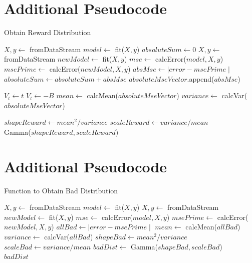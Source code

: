 \documentclass{mpaper}
\begin{document}
\begin{appendix}

\section{Additional Pseudocode}\label{rewarddist}
\begin{algorithm}[h]
\caption{Obtain Reward Distribution}
\begin{algorithmic}
    \State $X, y \gets$ fromDataStream
    \State $model \gets$ fit($X,y$)
    \State $absoluteSum \gets 0$
        \State $X, y \gets$ fromDataStream
        \State $newModel \gets$ fit($X,y$)
        \State $mse \gets$ calcError($model,X,y$)
        \State $msePrime \gets$ calcError($newModel,X,y$)
        \State $absMse \gets \mid error - msePrime \mid$
        \State $absoluteSum \gets absoluteSum + absMse$
        \State $absoluteMseVector$.append($absMse$)
        
            \State $V_t \gets t$
        \Else
            \State $V_t \gets -B$
        \EndIf
    \EndFor
    \State $mean \gets$ calcMean($absoluteMseVector$)
    \State $variance \gets$ calcVar($absoluteMseVector$)
    
    \State $shapeReward \gets mean^2/variance$
    \State $scaleReward \gets variance/mean$\\
    \Return Gamma($shapeReward, scaleReward$)
    
\EndFunction
\end{algorithmic}
\end{algorithm}

\section{Additional Pseudocode}\label{baddist}
\begin{algorithm}[h]
\caption{Function to Obtain Bad Distribution}
\begin{algorithmic}
    \State $X, y \gets$ fromDataStream
    \State $model \gets$ fit($X,y$)
        \State $X, y \gets$ fromDataStream
        \State $newModel \gets$ fit($X,y$)
        \State $mse \gets$ calcError($model,X,y$)
        \State $msePrime \gets$ calcError($newModel,X,y$)
        \State $allBad \gets \mid error - msePrime \mid$
    \EndFor
    \State $mean \gets$ calcMean($allBad$)
    \State $variance \gets$ calcVar($allBad$)
    \State $shapeBad \gets mean^2/variance$
    \State $scaleBad \gets variance/mean$
    \State $badDist \gets$ Gamma($shapeBad, scaleBad$)\\
    \Return $badDist$
\EndFunction
\end{algorithmic}
\end{algorithm}


\end{appendix}
\end{document}
